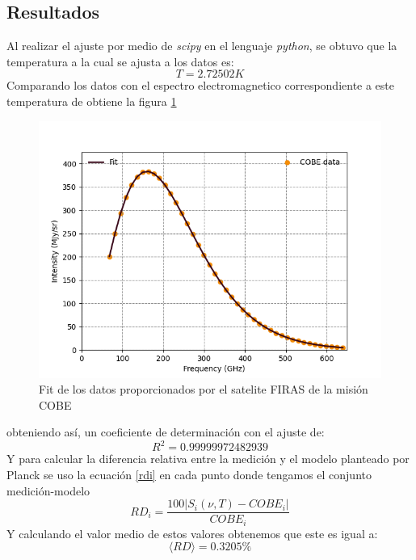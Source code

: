 \documentclass[12pt,letterpaper]{article}
\begin{document}
\begin{multicols}{2}
\section*{Resultados}
Al realizar el ajuste por medio de \textit{scipy} en el lenguaje  \textit{python}, se obtuvo que la temperatura a la cual se ajusta a los datos es:
\begin{equation*}
T=2.72502K
\end{equation*}
Comparando los datos con el espectro electromagnetico correspondiente a este temperatura de obtiene la figura \ref{fit}
\begin{figure}[H]
\includegraphics[scale=0.45]{../Graphics/fit.png}
\caption{Fit de los datos proporcionados por el satelite FIRAS de la misión COBE}
\label{fit}
\end{figure}
obteniendo así, un coeficiente de determinación con el ajuste de:
\begin{equation*}
R^2=0.99999972482939
\label{coef_deter}
\end{equation*}
Y para calcular la diferencia relativa entre la medición y el modelo planteado por Planck se uso la ecuación \ref{rdi} en cada punto donde tengamos el conjunto medición-modelo
\begin{equation}
RD_i = \frac{100|S_i(\nu,T)-COBE_i|}{COBE_i}
\label{rdi}
\end{equation}
Y calculando el valor medio de estos valores obtenemos que este es igual a:
\begin{equation*}
\langle RD \rangle = 0.3205\%
\end{equation*}
\begin{figure}[H]

\end{figure}
\end{multicols}
\end{document}
